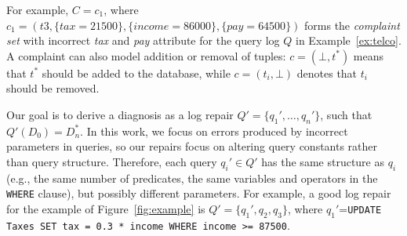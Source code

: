 For example, {\color{blue} $C = {c_1}$, where 
$c_1 = (t3, \{tax = 21500\}, \{income = 86000\}, \{pay = 64500\})$ 
forms the \textit{complaint set} with incorrect \textit{tax} and \textit{pay} attribute 
for the query log $Q$ in Example~\ref{ex:telco}}. A complaint 
can also model addition or removal of tuples: 
$c = (\bot, t^*)$ means that $t^*$ should be added to the database, 
while $c = (t_i, \bot)$ denotes that $t_i$ should be removed.

Our goal is to derive a diagnosis as a log repair
$Q'=\{q_1',\dots, q_n'\}$, such that
$Q'(D_0)=D_n^* $. In this work, we focus on errors produced
by incorrect parameters in queries, so our repairs focus on altering
query constants rather than query structure. Therefore, each query
$q_i'\in Q'$ has the same structure as $q_i$
(e.g., the same number of predicates, the same variables and operators 
in the \texttt{WHERE} clause), 
but possibly different parameters. 
{\color{blue}
For example, a good log repair for the
example of Figure~\ref{fig:example} is
$Q'=\{q_1',q_2,q_3\}$, where $q_1'$=\texttt{UPDATE Taxes
SET tax = 0.3 * income WHERE income >= 87500}}.